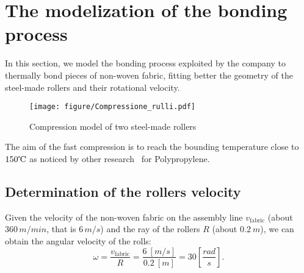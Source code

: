 
\clearpage
\section{The modelization of the bonding process}
\label{bondingprocess}
In this section, we model the bonding process exploited by the company to thermally bond pieces of non-woven fabric, fitting better the geometry of the steel-made rollers and their rotational velocity. 

\newcommand{\VT}{v_{\mathrm{fabric}}}
\newcommand{\Roller}{R}
\newcommand{\cratio}{r}
\newcommand{\VRot}{\omega}
\newcommand{\droller}{d_r}
\newcommand{\Tmodel}{T}
\newcommand{\Tamb}{T_{\textrm{ambient}}}


\begin{figure}[H]
  \begin{center}
    \texttt{[image: figure/Compressione\_rulli.pdf]}
  \end{center}
  \caption{Compression model of two steel-made rollers}
  \label{fig:compression}
\end{figure}

The aim of the fast compression is to reach the bounding temperature close to $150\celsius$
as noticed by other research~\cite{Hegde2008,Bhat2004} for Polypropylene.

\subsection{Determination of the rollers velocity}
Given the velocity of the non-woven fabric on the assembly line $\VT$ (about $360\,\unit{m}/\unit{min}$, that is $6\,\unit{m}/\unit{s}$) and the ray of the rollers $\Roller$ (about $0.2 \ \unit{m}$), we can obtain the angular velocity of the rolls:
\begin{equation}\label{eq:omega:def}
    \VRot = \dfrac{\VT}{\Roller} = \dfrac{6 \ [\unit{m}/\unit{s}]}{0.2 \ [\unit{m}]} = 30\left[\dfrac{\unit{rad}}{\unit{s}}\right].
\end{equation}

